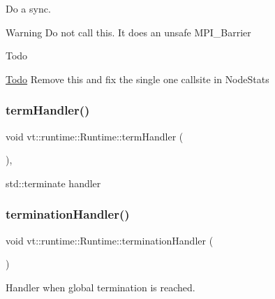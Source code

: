 Do a sync. 

\begin{DoxyWarning}{Warning}
Do not call this. It does an unsafe {\ttfamily M\+P\+I\+\_\+\+Barrier} 
\end{DoxyWarning}
\begin{DoxyRefDesc}{Todo}
\item[\hyperlink{todo__todo000001}{Todo}]Remove this and fix the single one callsite in {\ttfamily Node\+Stats} \end{DoxyRefDesc}
\mbox{\label{structvt_1_1runtime_1_1_runtime_abe295b9ea216fafe2b494e2bc609f8fb}} 
\subsubsection{\texorpdfstring{term\+Handler()}{termHandler()}}
{\footnotesize\ttfamily void vt\+::runtime\+::\+Runtime\+::term\+Handler (\begin{DoxyParamCaption}{ }\end{DoxyParamCaption})\hspace{0.3cm}{\ttfamily [static]}, {\ttfamily [protected]}}



std\+::terminate handler 

\mbox{\label{structvt_1_1runtime_1_1_runtime_a2d12f2a97d99585ef8e89cda0ed48972}} 
\subsubsection{\texorpdfstring{termination\+Handler()}{terminationHandler()}}
{\footnotesize\ttfamily void vt\+::runtime\+::\+Runtime\+::termination\+Handler (\begin{DoxyParamCaption}{ }\end{DoxyParamCaption})\hspace{0.3cm}{\ttfamily [protected]}}



Handler when global termination is reached. 

